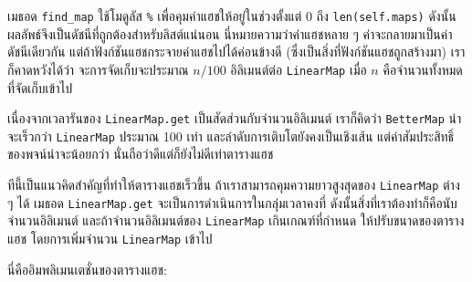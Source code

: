 
เมธอด \verb"find_map"  ใช้โมดูลัส \verb|%| เพื่อคุมค่าแฮชให้อยู่ในช่วงตั้งแต่ 0 ถึง {\tt len(self.maps)} 
ดังนั้นผลลัพธ์จึงเป็นดัชนีที่ถูกต้องสำหรับลิสต์แน่นอน 
นี่หมายความว่าค่าแฮชหลาย ๆ ค่าจะกลายมาเป็นค่าดัชนีเดียวกัน 
แต่ถ้าฟังก์ชันแฮชกระจายค่าแฮชไปได้ค่อนข้างดี (ซึ่งเป็นสิ่งที่ฟังก์ชันแฮชถูกสร้างมา) 
เราก็คาดหวังได้ว่า จะการจัดเก็บจะประมาณ {\scriptsize$n/100$} อิลิเมนต์ต่อ \texttt{LinearMap}
เมื่อ $n$ คือจำนวนทั้งหมดที่จัดเก็บเข้าไป


เนื่องจากเวลารันของ {\tt LinearMap.get} เป็นสัดส่วนกับจำนวนอิลิเมนต์ 
เราก็คิดว่า \texttt{BetterMap} น่าจะเร็วกว่า \texttt{LinearMap} ประมาณ 100 เท่า 
และลำดับการเติบโตยังคงเป็นเชิงเส้น แต่ค่าสัมประสิทธิ์ของพจน์นำจะน้อยกว่า นั่นถือว่าดีแต่ก็ยังไม่ดีเท่าตารางแฮช


ทีนี้เป็นแนวคิดสำคัญที่ทำให้ตารางแฮชเร็วขึ้น 
ถ้าเราสามารถคุมความยาวสูงสุดของ \texttt{LinearMap} ต่าง ๆ ได้ 
เมธอด {\tt LinearMap.get} จะเป็นการดำเนินการในกลุ่มเวลาคงที่ 
ดังนั้นสิ่งที่เราต้องทำก็คือนับจำนวนอิลิเมนต์ และถ้าจำนวนอิลิเมนต์ของ \texttt{LinearMap} เกินเกณฑ์ที่กำหนด
ให้ปรับขนาดของตารางแฮช โดยการเพิ่มจำนวน \texttt{LinearMap} เข้าไป

นี่คืออิมพลิเมนเตชั่นของตารางแฮช:

